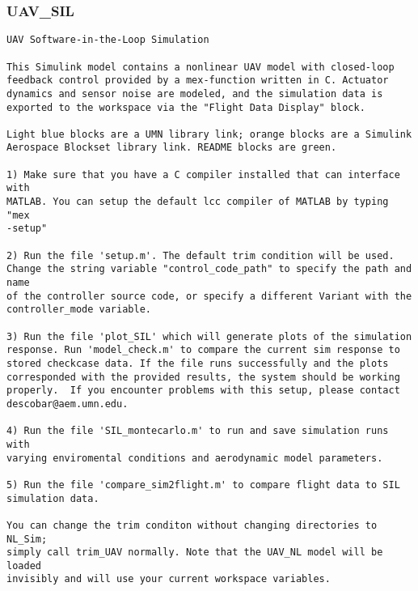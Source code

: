 \documentclass[12pt]{article}
\begin{document}
\subsubsection{UAV\_SIL}
\begin{verbatim}
UAV Software-in-the-Loop Simulation

This Simulink model contains a nonlinear UAV model with closed-loop
feedback control provided by a mex-function written in C. Actuator
dynamics and sensor noise are modeled, and the simulation data is 
exported to the workspace via the "Flight Data Display" block.  

Light blue blocks are a UMN library link; orange blocks are a Simulink
Aerospace Blockset library link. README blocks are green.

1) Make sure that you have a C compiler installed that can interface with
MATLAB. You can setup the default lcc compiler of MATLAB by typing "mex
-setup"

2) Run the file 'setup.m'. The default trim condition will be used.
Change the string variable "control_code_path" to specify the path and name
of the controller source code, or specify a different Variant with the
controller_mode variable.

3) Run the file 'plot_SIL' which will generate plots of the simulation
response. Run 'model_check.m' to compare the current sim response to
stored checkcase data. If the file runs successfully and the plots
corresponded with the provided results, the system should be working
properly.  If you encounter problems with this setup, please contact
descobar@aem.umn.edu.

4) Run the file 'SIL_montecarlo.m' to run and save simulation runs with 
varying enviromental conditions and aerodynamic model parameters.

5) Run the file 'compare_sim2flight.m' to compare flight data to SIL 
simulation data.

You can change the trim conditon without changing directories to NL_Sim;
simply call trim_UAV normally. Note that the UAV_NL model will be loaded
invisibly and will use your current workspace variables.



\end{verbatim}
\end{document}
